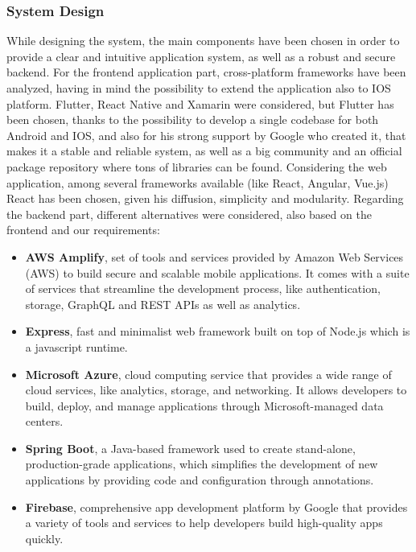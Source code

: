 \subsubsection{System Design}

While designing the system, the main components have been chosen in order to provide a clear and intuitive application system, as well as a robust and secure backend.
\newline For the frontend application part, cross-platform frameworks have been analyzed, having in mind the possibility to extend the application also to IOS platform. Flutter, React Native and Xamarin were considered, but Flutter has been chosen, thanks to the possibility to develop a single codebase for both Android and IOS, and also for his strong support by Google who created it, that makes it a stable and reliable system, as well as a big community and an official package repository where tons of libraries can be found. Considering the web application, among several frameworks available (like React, Angular, Vue.js) React has been chosen, given his diffusion, simplicity and modularity.   
\newline Regarding the backend part, different alternatives were considered, also based on the frontend and our requirements:
\begin{itemize}[nosep] %
    \item \textbf{AWS Amplify}, set of tools and services provided by Amazon Web Services (AWS) to build secure and scalable mobile applications. It comes with a suite of services that streamline the development process, like authentication, storage, GraphQL and REST APIs as well as analytics. 
    \item \textbf{Express}, fast and minimalist web framework built on top of Node.js which is a javascript runtime.
    \item \textbf{Microsoft Azure}, cloud computing service that provides a wide range of cloud services, like analytics, storage, and networking. It allows developers to build, deploy, and manage applications through Microsoft-managed data centers.
    \item \textbf{Spring Boot}, a Java-based framework used to create stand-alone, production-grade applications, which simplifies the development of new applications by providing code and configuration through annotations.
    \item \textbf{Firebase}, comprehensive app development platform by Google that provides a variety of tools and services to help developers build high-quality apps quickly.
\end{itemize}
